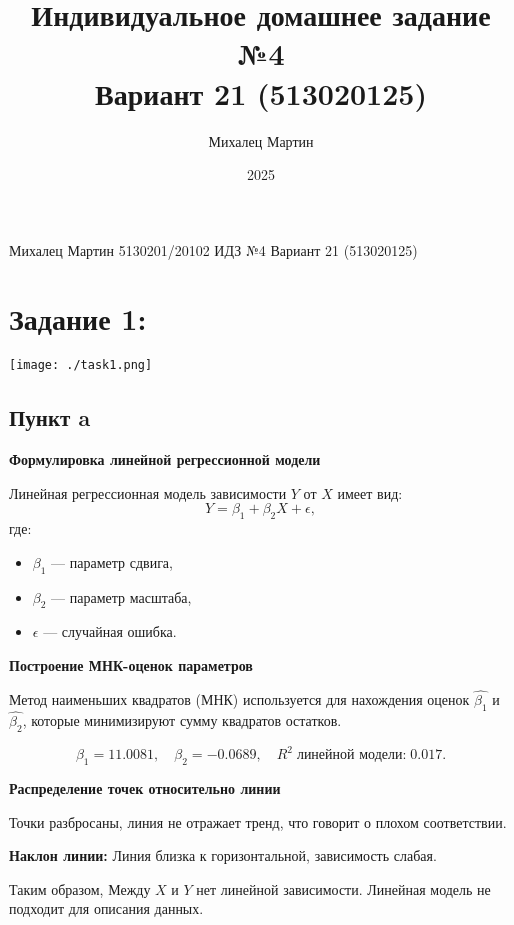 \documentclass[12pt]{spbstu-task}
\institute{Институт компьютерных наук и кибербезопасности}
\author{Михалец Мартин}
\date{2025}
\title{Индивидуальное домашнее задание №4\\\medskip
\large Вариант 21 (513020125)}
\begin{document}
\sloppy
{}
Михалец Мартин 5130201/20102 \hfill ИДЗ №4 \hfill Вариант 21 (513020125)
\section{\textbf{Задание} 1:}
\label{sec:orgc069df6}
\begin{center}
\texttt{[image: ./task1.png]}
\end{center}
\subsection{Пункт a}
\label{sec:org12aca2d}
\begin{figure}[H]
\centering

\end{figure}

\textbf{Формулировка линейной регрессионной модели}

Линейная регрессионная модель зависимости \(Y\) от \(X\) имеет вид: \[
Y = \beta_1 + \beta_2 X + \epsilon, \] где:
\begin{itemize}
\item \(\beta_1\) --- параметр сдвига,
\item \(\beta_2\) --- параметр масштаба,
\item \(\epsilon\) --- случайная ошибка.
\end{itemize}

\textbf{Построение МНК-оценок параметров}

Метод наименьших квадратов (МНК) используется для нахождения оценок
\(\hat{\beta_1}\) и \(\hat{\beta_2}\), которые минимизируют сумму
квадратов остатков.

\begin{displaymath}
  \beta_1 = 11.0081,\quad
  \beta_2 = -0.0689,\quad
  R^2 \;\text{линейной модели:}\; 0.017.
\end{displaymath}

\begin{figure}[H]
\centering

\end{figure}

\textbf{Распределение точек относительно линии}

Точки разбросаны, линия не отражает тренд, что говорит о плохом
соответствии.

\textbf{Наклон линии:} Линия близка к горизонтальной, зависимость слабая.

Таким образом, Между \(X\) и \(Y\) нет линейной зависимости.  Линейная
модель не подходит для описания данных.
\end{document}
